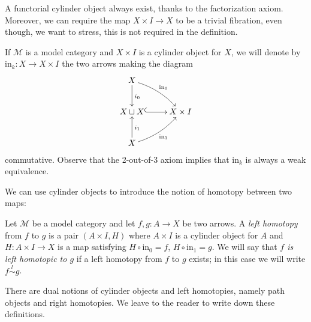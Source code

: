 \begin{refsection}
\begin{rmk}
A functorial cylinder object always exist, thanks to the factorization axiom. Moreover, we can require the map $X \times I \to X$ to be a trivial fibration, even though, we want to stress, this is not required in the definition.
\end{rmk}


\begin{rmk}
If $\mathcal M$ is a model category and $X \times I$ is a cylinder object for $X$, we will denote by $\mathrm{in}_k \colon X \to X \times I$ the two arrows making the diagram
\[
\xymatrix{ X \ar[d]^{i_0} \ar@/^.5pc/[dr]^{\mathrm{in}_0} \\ X \sqcup X \ar@{^(->}[r] & X \times I \\ X \ar[u]_{i_1} \ar@/_.5pc/[ur]_{\mathrm{in}_1} }
\]
commutative. Observe that the 2-out-of-3 axiom implies that $\mathrm{in}_k$ is always a weak equivalence.
\end{rmk}

We can use cylinder objects to introduce the notion of homotopy between two maps:

\begin{defin} \label{def left homotopy}
Let $\mathcal M$ be a model category and let $f,g \colon A \to X$ be two arrows. A \emph{left homotopy} from $f$ to $g$ is a pair $(A \times I, H)$ where $A \times I$ is a cylinder object for $A$ and $H \colon A \times I \to X$ is a map satisfying $H \circ \mathrm{in}_0 = f$, $H \circ \mathrm{in}_1 = g$. We will say that \emph{$f$ is left homotopic to $g$} if a left homotopy from $f$ to $g$ exists; in this case we will write $f \stackrel{l}{\sim} g$.
\end{defin}

\begin{rmk}
There are dual notions of cylinder objects and left homotopies, namely path objects and right homotopies. We leave to the reader to write down these definitions.
\end{rmk}


\end{refsection}
